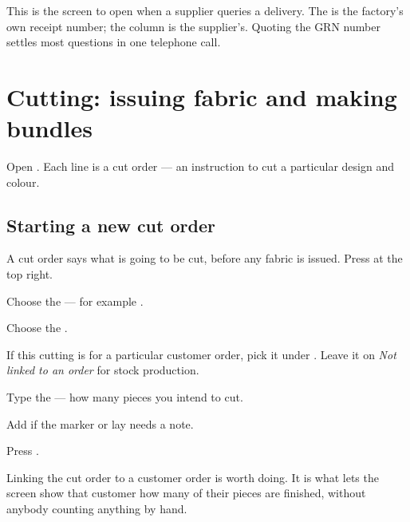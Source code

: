 
\begin{tipbox}
This is the screen to open when a supplier queries a delivery. The 
is the factory's own receipt number; the  column is the
supplier's. Quoting the GRN number settles most questions in one telephone call.
\end{tipbox}

\section{Cutting: issuing fabric and making bundles}

Open . Each line is a cut order --- an instruction to cut a
particular design and colour.


\subsection{Starting a new cut order}

A cut order says what is going to be cut, before any fabric is issued. Press
 at the top right.


\begin{steps}
  \item Choose the  --- for example
        .
  \item Choose the .
  \item If this cutting is for a particular customer order, pick it under
        . Leave it on \emph{Not linked to an order} for
        stock production.
  \item Type the  --- how many pieces you intend to cut.
  \item Add  if the marker or lay needs a note.
  \item Press .
\end{steps}

\begin{tipbox}
Linking the cut order to a customer order is worth doing. It is what lets the
 screen show that customer how many of their pieces are finished,
without anybody counting anything by hand.
\end{tipbox}

